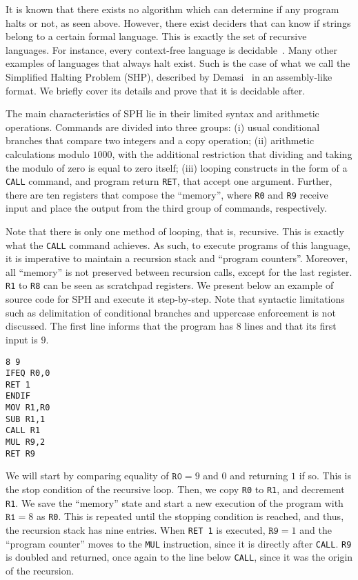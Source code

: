 \documentclass[12pt]{article}
\begin{document}
It is known that there exists no algorithm which can determine if any program halts or not, as seen above. However, there exist deciders that can know if strings belong to a certain formal language. This is exactly the set of recursive languages. For instance, every context-free language is decidable~\cite[Theorem 4.9]{Sipser:book:2012}. Many other examples of languages that always halt exist. Such is the case of what we call the Simplified Halting Problem (SHP), described by Demasi~\cite{Demasi:misc:2013:may} in an assembly-like format. We briefly cover its details and prove that it is decidable after.

The main characteristics of SPH lie in their limited syntax and arithmetic operations. Commands are divided into three groups: (i) usual conditional branches that compare two integers and a copy operation; (ii) arithmetic calculations modulo $1000$, with the additional restriction that dividing and taking the modulo of zero is equal to zero itself; (iii) looping constructs in the form of a \texttt{CALL} command, and program return \texttt{RET}, that accept one argument. Further, there are ten registers that compose the ``memory'', where \texttt{R0} and \texttt{R9} receive input and place the output from the third group of commands, respectively.

Note that there is only one method of looping, that is, recursive. This is exactly what the \texttt{CALL} command achieves. As such, to execute programs of this language, it is imperative to maintain a recursion stack and ``program counters''. Moreover, all ``memory'' is not preserved between recursion calls, except for the last register. \texttt{R1} to \texttt{R8} can be seen as scratchpad registers. We present below an example of source code for SPH and execute it step-by-step. Note that syntactic limitations such as delimitation of conditional branches and uppercase enforcement is not discussed. The first line informs that the program has $8$ lines and that its first input is $9$.

{\footnotesize
\begin{verbatim}
8 9
IFEQ R0,0
RET 1
ENDIF
MOV R1,R0
SUB R1,1
CALL R1
MUL R9,2
RET R9
\end{verbatim}}

We will start by comparing equality of $\texttt{R0} = 9$ and $0$ and returning $1$ if so. This is the stop condition of the recursive loop. Then, we copy \texttt{R0} to \texttt{R1}, and decrement \texttt{R1}. We save the ``memory'' state and start a new execution of the program with $\texttt{R1} = 8$ as \texttt{R0}. This is repeated until the stopping condition is reached, and thus, the recursion stack has nine entries. When \texttt{RET 1} is executed, $\texttt{R9} = 1$ and the ``program counter'' moves to the \texttt{MUL} instruction, since it is directly after \texttt{CALL}. \texttt{R9} is doubled and returned, once again to the line below \texttt{CALL}, since it was the origin of the recursion. 
\end{document}
